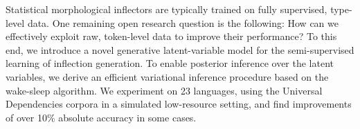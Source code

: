 Statistical morphological inflectors are typically trained on fully supervised, type-level data. One remaining open research question is the following: How can we effectively exploit raw, token-level data to improve their performance? To this end, we introduce a novel generative latent-variable model for the semi-supervised learning of inflection generation. To enable posterior inference over the latent variables, we derive an efficient variational inference procedure based on the wake-sleep algorithm. We experiment on 23 languages, using the Universal Dependencies corpora in a simulated low-resource setting, and find improvements of over 10\% absolute accuracy in some cases.
